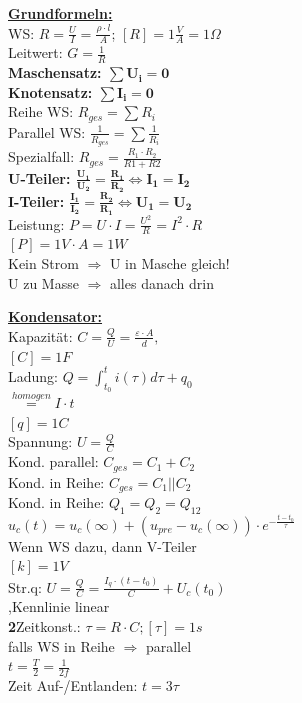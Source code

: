 \documentclass[8pt]{extarticle}
\begin{document}
\begin{minipage}{0.33\textwidth}

\underline{\textbf{Grundformeln:}}\\
WS: $R = \frac{U}{I} = \frac{\rho \cdot l}{A}$; $[R] = 1\frac{V}{A} =1 \Omega$\\
Leitwert: $G = \frac{1}{R}$\\
\textbf{Maschensatz: $\mathbf{\sum U_i = 0}$\\}
\textbf{Knotensatz: $\mathbf{\sum I_i = 0}$\\}
Reihe WS: $R_{ges} = \sum R_i$\\
Parallel WS: $\frac{1}{R_{ges}} = \sum \frac{1}{R_i}$\\
\phantom{ss} Spezialfall: $R_{ges} = \frac{R_1 \cdot R_2}{R1+R2} $\\
\textbf{U-Teiler: $\mathbf{\frac{U_1}{U_2} = \frac{R_1}{R_2}\Leftrightarrow I_1 = I_2}$\\}
\textbf{I-Teiler: $\mathbf{\frac{I_1}{I_2} = \frac{R_2}{R_1}\Leftrightarrow U_1 = U_2}$\\}
Leistung: $P =U \cdot I = \frac{U^2}{R} = I^2 \cdot R $ \\
\phantom{ssssssssss} $[P] = 1V \cdot A =1 W$\\
Kein Strom $\Rightarrow$ U in Masche gleich!\\
U zu Masse $\Rightarrow$ alles danach drin

\underline{\textbf{Kondensator:}}\\
Kapazität: $C = \frac{Q}{U} = \frac{\varepsilon \cdot A }{d},$\\
\phantom{ssssssssssii} $[C]=1F$\\
Ladung: $Q = \int_{t_0}^t i(\tau) d\tau + q_0$\\
\phantom{sssssssis} $\stackrel{homogen}{=} I \cdot t$\\
\phantom{ssssssssssii} $[q]=1C$\\
Spannung: $U = \frac{Q}{C}$\\
Kond. parallel: $C_{ges} = C_1 + C_2$\\
Kond. in Reihe: $C_{ges} = C_1 || C_2$\\
Kond. in Reihe: $Q_1 = Q_2 = Q_{12}$\\

$u_c(t) = u_c(\infty) + (u_{pre} - u_c(\infty)) \cdot e^{-\frac{t-t_0}{\tau}}$\\
Wenn WS dazu, dann V-Teiler\\
$[k] = 1V$\\
Str.q: $U = \frac{Q}{C} = \frac{I_q \cdot (t-t_0)}{C} + U_c(t_0)$\\
\phantom{sss} ,Kennlinie linear\\
\textbf{2}Zeitkonst.: $\tau = R \cdot C;[\tau] = 1s$\\
\phantom{ss}falls WS in Reihe $\Rightarrow$ parallel\\
$t =\frac{T}{2} = \frac{1}{2f}$\\
Zeit Auf-/Entlanden: $t = 3\tau$\\


\end{minipage}
\end{document}
